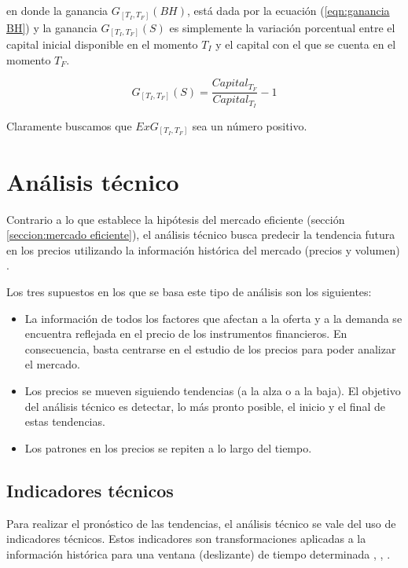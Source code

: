 \documentclass[12pt]{report}
\theoremstyle{break}
\theoremstyle{break}
\begin{document}
en donde la ganancia $G_{\left[T_{I}, T_{F}\right]} (BH)$, está dada por la ecuación (\ref{eqn:ganancia BH}) y la ganancia $G_{\left[T_{I}, T_{F}\right]} (S)$ es simplemente la variación porcentual entre el capital inicial disponible en el momento $T_{I}$ y el capital con el que se cuenta en el momento $T_{F}$.

\begin{equation} \label{eqn:Ganancia estrategia S}
G_{\left[T_{I}, T_{F}\right]}(S) = \dfrac{Capital_{T_F}}{Capital_{T_I} } - 1 
\end{equation}

Claramente buscamos que $ExG_{\left[T_{I}, T_{F}\right]}$ sea un número positivo.

\section{Análisis técnico}
\label{seccion:analisisTecnico}
Contrario a lo que establece la hipótesis del mercado eficiente (sección \ref{seccion:mercado eficiente}), el análisis técnico busca predecir la tendencia futura en los precios utilizando la información histórica del mercado (precios y volumen) \cite{murphy1999technical}.

Los tres supuestos en los que se basa este tipo de análisis son los siguientes:

\begin{itemize}
\item La información de todos los factores que afectan a la oferta y a la demanda se encuentra reflejada en el precio de los instrumentos financieros. En consecuencia, basta centrarse en el estudio de los precios para poder analizar el mercado.

\item Los precios se mueven siguiendo tendencias (a la alza o a la baja). El objetivo del análisis técnico es detectar, lo más pronto posible, el inicio y el final de estas tendencias.

\item Los patrones en los precios se repiten a lo largo del tiempo.
\end{itemize}


\subsection{Indicadores técnicos}
\label{subseccion:indicadores tecnicos}
Para realizar el pronóstico de las tendencias, el análisis técnico se vale del uso de indicadores técnicos. Estos indicadores son transformaciones aplicadas a la información histórica para una ventana (deslizante) de tiempo determinada \cite{murphy1999technical}, \cite{technicalAnalysisKirkPatrick}, \cite{encycoplediaTechnicalIndicators}.
\end{document}
